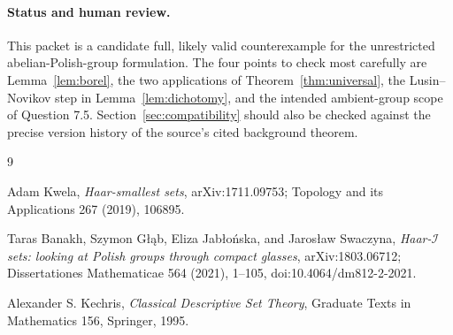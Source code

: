 \documentclass[11pt]{article}
\begin{document}
\paragraph{Status and human review.}
This packet is a candidate full, likely valid counterexample for the
unrestricted abelian-Polish-group formulation.  The four points to check most
carefully are Lemma~\ref{lem:borel}, the two applications of
Theorem~\ref{thm:universal}, the Lusin--Novikov step in
Lemma~\ref{lem:dichotomy}, and the intended ambient-group scope of Question
7.5.  Section~\ref{sec:compatibility} should also be checked against the
precise version history of the source's cited background theorem.

\begin{thebibliography}{9}

Adam Kwela,
\emph{Haar-smallest sets},
arXiv:1711.09753; Topology and its Applications 267 (2019), 106895.

Taras Banakh, Szymon G\l{}\k{a}b, Eliza Jab\l{}o\'nska, and Jaros\l{}aw Swaczyna,
\emph{Haar-$\mathcal I$ sets: looking at Polish groups through compact glasses},
arXiv:1803.06712; Dissertationes Mathematicae 564 (2021), 1--105,
doi:10.4064/dm812-2-2021.

Alexander S. Kechris,
\emph{Classical Descriptive Set Theory},
Graduate Texts in Mathematics 156, Springer, 1995.

\end{thebibliography}
\end{document}
